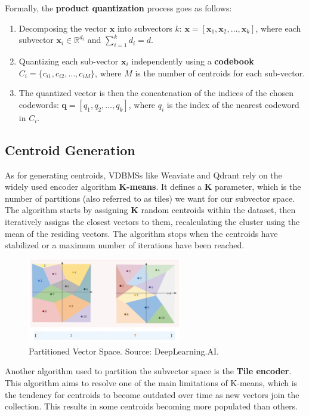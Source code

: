 Formally, the \textbf{product quantization} process goes as follows:
\begin{enumerate}
    \item Decomposing the vector \( \mathbf{x} \) into subvectors \( k \): \( \mathbf{x} = [\mathbf{x}_1, \mathbf{x}_2, \dots, \mathbf{x}_k] \), where each subvector \( \mathbf{x}_i \in \mathbb{R}^{d_i} \) and \( \sum_{i=1}^k d_i = d \).
    \item Quantizing each sub-vector \( \mathbf{x}_i \) independently using a \textbf{codebook} \( C_i = \{c_{i1}, c_{i2}, \dots, c_{iM}\} \), where \( M \) is the number of centroids for each sub-vector.
    \item The quantized vector is then the concatenation of the indices of the chosen codewords: \( \mathbf{q} = [q_1, q_2, \dots, q_k] \), where \( q_i \) is the index of the nearest codeword in \( C_i \).
\end{enumerate}


\subsection{Centroid Generation}
As for generating centroids, VDBMSs like Weaviate and Qdrant rely on the widely used encoder algorithm \textbf{K-means}. It defines a \textbf{K} parameter, which is the number of partitions (also referred to as tiles) we want for our subvector space. The algorithm starts by assigning \textbf{K} random centroids within the dataset, then iteratively assigns the closest vectors to them, recalculating the cluster using the mean of the residing vectors. The algorithm stops when the centroids have stabilized or a maximum number of iterations have been reached.
\begin{figure}[h]
    \centering
\includegraphics[width=0.6\textwidth]{IMAGES/immagine_2025-02-27_123033735.png}
    \caption{Partitioned Vector Space. Source: DeepLearning.AI.\footnotemark[1]}
    \label{fig:PQ}
\end{figure}
Another algorithm used to partition the subvector space is the \textbf{Tile encoder}. This algorithm aims to resolve one of the main limitations of K-means, which is the tendency for centroids to become outdated over time as new vectors join the collection. This results in some centroids becoming more populated than others. 


